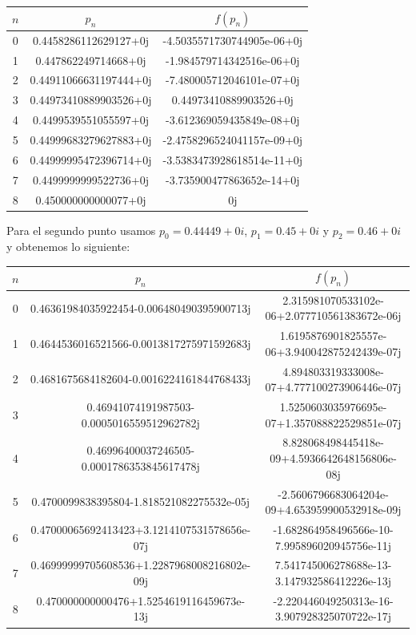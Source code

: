 \documentclass{article}
\begin{document}
\begin{center}
    \begin{tabular}{||c c c||} 
    \hline
    $n$ & $p_{n}$ & $f(p_n)$ \\ [0.5ex] 
    \hline
    0 & 0.4458286112629127+0j & -4.5035571730744905e-06+0j\\
    \hline
    1 & 0.447862249714668+0j & -1.984579714342516e-06+0j \\
    \hline
    2 & 0.44911066631197444+0j & -7.480005712046101e-07+0j \\
    \hline
    3 & 0.44973410889903526+0j & 0.44973410889903526+0j \\ 
    \hline
    4 & 0.4499539551055597+0j & -3.612369059435849e-08+0j \\ 
    \hline
    5 & 0.44999683279627883+0j & -2.4758296524041157e-09+0j \\ 
    \hline
    6 & 0.44999995472396714+0j & -3.5383473928618514e-11+0j \\ 
    \hline
    7 & 0.4499999999522736+0j & -3.735900477863652e-14+0j \\ 
    \hline
    8 & 0.450000000000077+0j & 0j \\ [1ex]
    \hline
   \end{tabular}
\end{center}

Para el segundo punto usamos $p_0 = 0.44449 + 0i$, $p_1 = 0.45 + 0i$ y $p_2 = 0.46 + 0i$ y obtenemos lo siguiente:

\begin{center}
    \begin{tabular}{||c c c||} 
    \hline
    $n$ & $p_{n}$ & $f(p_n)$ \\ [0.5ex] 
    \hline
    0 & 0.46361984035922454-0.006480490395900713j & 2.315981070533102e-06+2.077710561383672e-06j\\
    \hline
    1 & 0.4644536016521566-0.0013817275971592683j& 1.6195876901825557e-06+3.940042875242439e-07j \\
    \hline
    2 & 0.4681675684182604-0.0016224161844768433j & 4.894803319333008e-07+4.777100273906446e-07j \\
    \hline
    3 & 0.46941074191987503-0.0005016559512962782j & 1.5250603035976695e-07+1.357088822529851e-07j \\ 
    \hline
    4 & 0.46996400037246505-0.0001786353845617478j & 8.828068498445418e-09+4.5936642648156806e-08j \\ 
    \hline
    5 & 0.4700099838395804-1.818521082275532e-05j & -2.5606796683064204e-09+4.653959900532918e-09j \\ 
    \hline
    6 & 0.47000065692413423+3.1214107531578656e-07j & -1.682864958496566e-10-7.995896020945756e-11j \\ 
    \hline
    7 & 0.46999999705608536+1.2287968008216802e-09j & 7.541745006278688e-13-3.147932586412226e-13j \\ 
    \hline
    8 & 0.470000000000476+1.5254619116459673e-13j & -2.220446049250313e-16-3.907928325070722e-17j \\ [1ex]
    \hline
   \end{tabular}
\end{center}
\end{document}
